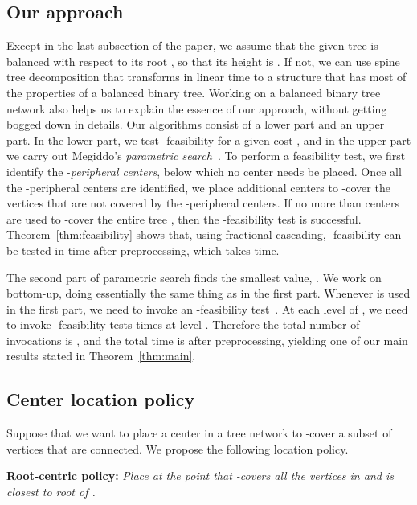 \documentclass{llncs}
\begin{document}
{\subsection{Our approach}\label{sec:approach}
Except in the last subsection of the paper,
we assume that the given tree  is balanced with respect to its root ,
so that its height is .
If not, we can use spine tree decomposition that transforms  in linear time to a structure
that has most of the properties of a balanced binary tree.
Working on a balanced binary tree network also helps us to explain the essence of our approach,
without getting bogged down in details. 
Our algorithms consist of a lower part and an upper part.
In the lower part, we test -feasibility for a given cost ,
and in the upper part we carry out Megiddo's {\em parametric search}~\cite{megiddo1979}.
To perform a feasibility test,
we first identify the -{\em peripheral centers},
below which no center needs be placed.
Once all the  -peripheral centers are identified,
we place  additional centers to -cover the vertices
that are not covered by the -peripheral centers.
If no more than  centers are used to -cover the entire tree ,
then the -feasibility test is successful.
Theorem~\ref{thm:feasibility} shows that, using fractional cascading, -feasibility can be tested
in  time
after preprocessing, which takes  time.

The second part of parametric search
finds the smallest  value, .
We work on  bottom-up, doing essentially the same thing as in the first part.
Whenever  is used in the first part,
we need to invoke an -feasibility test~\cite{megiddo1979}.
At each level of ,
we need to invoke -feasibility tests  times at level .
Therefore the total number of invocations is ,
and the total time is  after preprocessing,
yielding one of our main results stated in Theorem~\ref{thm:main}.

\subsection{Center location policy}
Suppose that we want to place a center  in a tree network  to -cover
a subset  of vertices that are connected.
We propose the following location policy.

\medskip\noindent
{\bf Root-centric policy:}
{\em Place  at the point that -covers all the vertices in  and is closest to root  of .}


}
\end{document}

